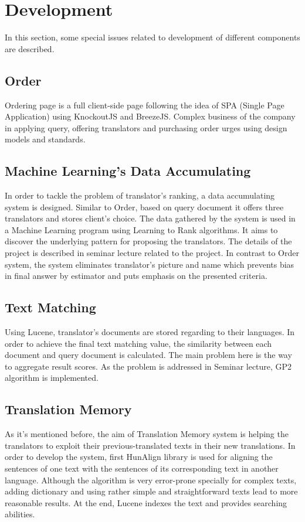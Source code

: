 \section{Development}
In this section, some special issues related to development of different components are described.

\subsection{Order}
Ordering page is a full client-side page following the idea of SPA (Single Page Application) using KnockoutJS and BreezeJS. Complex business of the company in applying query, offering translators and purchasing order urges using design models and standards.
\subsection{Machine Learning's Data Accumulating}
In order to tackle the problem of translator's ranking, a data accumulating system is designed. Similar to Order, based on query document it offers three translators and stores client's choice. The data gathered by the system is used in a Machine Learning program using Learning to Rank algorithms. It aims to discover the underlying pattern for proposing the translators. The details of the project is described in seminar lecture related to the project. In contrast to Order system, the system eliminates translator's picture and name which prevents bias in final answer by estimator and puts emphasis on the presented criteria.
\subsection{Text Matching}
Using Lucene, translator's documents are stored regarding to their languages. In order to achieve the final text matching value, the similarity between each document and query document is calculated. The main problem here is the way to  aggregate result scores. As the problem is addressed in Seminar lecture, GP2\cite{gp2} algorithm is implemented.
\subsection{Translation Memory}
As it's mentioned before, the aim of Translation Memory system is helping the translators to exploit their previous-translated texts in their new translations. In order to develop the system, first HunAlign library is used for aligning the sentences of one text with the sentences of its corresponding text in another language. Although the algorithm is very error-prone specially for complex texts, adding dictionary and using rather simple and straightforward texts lead to more reasonable results. At the end, Lucene indexes the text and provides searching abilities.